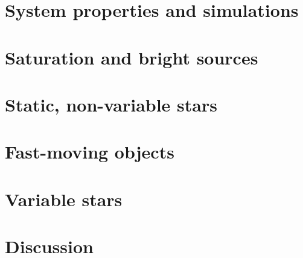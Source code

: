 \documentclass[12pt]{article}
\begin{document}
\section{System properties and simulations}

\section{Saturation and bright sources}

\section{Static, non-variable stars}

\section{Fast-moving objects}

\section{Variable stars}

\section{Discussion}
\end{document}
